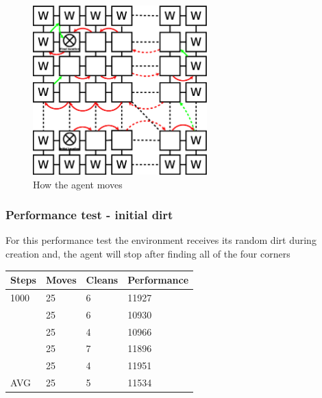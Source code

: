 \begin{figure}[b]\label{fig:simpleAlgorithm} \centering
\includegraphics[width=0.6\textwidth]{SimpleAlgorithm}
\caption{How the agent moves}
\end{figure}


\subsubsection{Performance test - initial dirt}
For this performance test the environment receives its random dirt during
creation and, the agent will stop after finding all of the four corners

\begin{longtable}{p{} p{} p{} 
									p{}}
Steps & Moves & Cleans	& Performance \\\hline
1000 & 25 & 6 & 11927 \\
 & 25 & 6 & 10930	\\
 & 25 & 4 & 10966	\\
 & 25 & 7 & 11896 \\
 & 25 & 4 & 11951 \\\hline
AVG		& 25 &  5	 & 11534	\\\hline
\end{longtable}


